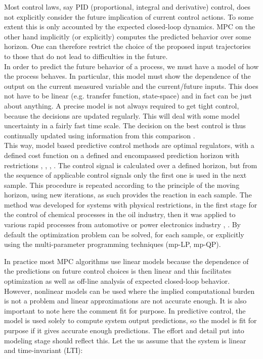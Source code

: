 Most control laws, say PID (proportional, integral and derivative) control, does not explicitly consider the future implication of current control actions. To some extent this is only accounted by the expected closed-loop dynamics. MPC on the other hand
implicitly (or explicitly) computes the predicted behavior over some horizon. One can therefore restrict the choice of the proposed input trajectories to those that do not lead to difficulties in the future.\\
In order to predict the future behavior of a process, we must have a model of how the process behaves. In particular, this model must show the dependence of the output on the current measured variable and the current/future inputs. This does not have to be linear (e.g. transfer function, state-space) and in fact can be just about anything. A precise model is not always required to get tight control, because the decisions are updated regularly. This will deal with some model uncertainty in a fairly fast time scale. The decision on the best control is thus continually updated using information from this comparison \cite{rossiter2017model}.\\
This way, model based predictive control methods are optimal regulators, with a defined cost function on a defined and encompassed prediction horizon with restrictions \cite{kwon2006receding}, \cite{baotic2005optimal}, \cite{herceg2009real}, \cite{grancharova2005survey}. The control signal is calculated over a defined horizon, but from the sequence of applicable control signals only the first one is used in the next sample. This procedure is repeated according to the principle of the moving horizon, using new iterations, as such provides the reaction in each sample. The method was developed for systems with physical restrictions, in the first stage for the control of chemical processes in the oil industry, then it was applied to various rapid processes from automotive or power electronics industry \cite{antoniewicz2009predictive} , \cite{geyer2005low}. By default the optimization problem can be solved, for each sample, or explicitly using the multi-parameter programming techniques (mp-LP, mp-QP).%

	\label{BASICCSR:sec:LQR}

In practice most MPC algorithms use linear models because the dependence of the predictions on future control choices is then linear and this facilitates optimization as well as off-line analysis of expected closed-loop behavior. However, nonlinear models can be used where the implied computational burden is not a problem and linear approximations are not accurate enough. It is also important to note here the comment fit for purpose. In predictive control, the model is used solely to compute system output predictions, so the model is fit for purpose if it gives accurate enough predictions. The effort and detail put into modeling stage should reflect this.	Let the us assume that the system is linear and time-invariant (LTI):
	
